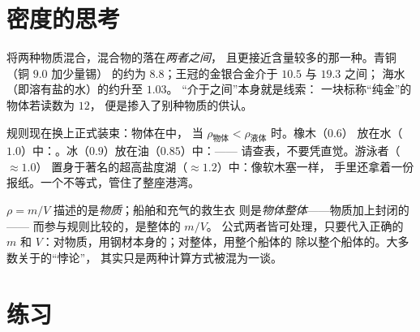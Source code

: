 \section{密度的思考}

\begin{example}[合金与中间情形]\label{ex:g7:volume-mass-density:alloys}
将两种物质混合，混合物的落在\emph{两者之间}，
且更接近含量较多的那一种。青铜（铜 $9.0$ 加少量锡）
的约为 $8.8$；王冠的金银合金介于 $10.5$ 与 $19.3$ 之间；
海水（即溶有盐的水）的约升至 $1.03$。
“介于之间”本身就是线索：
一块标称“纯金”的物体若读数为 $12$，
便是掺入了别种物质的供认。
\end{example}

\begin{example}[密度决定漂浮的世界]\label{ex:g7:volume-mass-density:floating}
规则现在换上正式装束：物体在中，
当 $\rho_{\text{物体}} < \rho_{\text{液体}}$ 时。橡木（$0.6$）
放在水（$1.0$）中：。冰（$0.9$）放在油（$0.85$）中：——
请查表，不要凭直觉。游泳者（$\approx 1.0$）
置身于著名的超高盐度湖（$\approx 1.2$）中：像软木塞一样，
手里还拿着一份报纸。一个不等式，管住了整座港湾。
\end{example}

\begin{remark}\label{rem:g7:volume-mass-density:parcel}
$\rho = m/V$ 描述的是\emph{物质}；船舶和充气的救生衣
则是\emph{物体整体}——物质加上封闭的——
而参与规则比较的，是整体的 $m/V$。
公式两者皆可处理，只要代入正确的 $m$ 和
$V$：对物质，用钢材本身的；对整体，用整个船体的
除以整个船体的。大多数关于的“悖论”，
其实只是两种计算方式被混为一谈。
\end{remark}

\section{练习}

